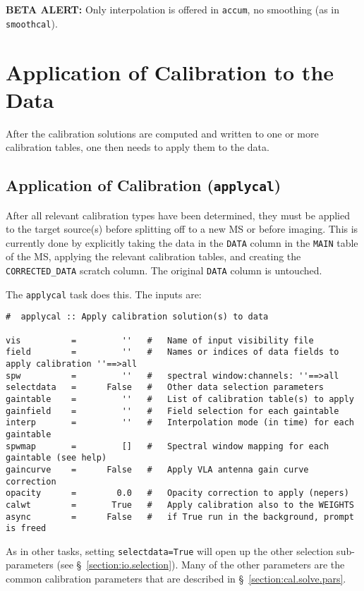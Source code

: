 {\bf BETA ALERT:} Only interpolation is offered in {\tt accum},
no smoothing (as in {\tt smoothcal}).

\section{Application of Calibration to the Data}
\label{section:cal.correct}

After the calibration solutions are computed and written to
one or more calibration tables, one then needs to apply them to the data.

\subsection{Application of Calibration ({\tt applycal})}
\label{section:cal.correct.apply}

After all relevant calibration types have been determined, they must
be applied to the target source(s) before splitting off to a new
MS or before imaging.  This is currently done by explicitly taking the
data in the {\tt DATA} column in the {\tt MAIN} table of the MS, 
applying the relevant calibration tables, and creating the 
{\tt CORRECTED\_DATA} scratch column.  The original {\tt DATA}
column is untouched.

The {\tt applycal} task does this.  The inputs are:
\small
\begin{verbatim}
#  applycal :: Apply calibration solution(s) to data

vis          =         ''   #   Name of input visibility file
field        =         ''   #   Names or indices of data fields to apply calibration ''==>all
spw          =         ''   #   spectral window:channels: ''==>all
selectdata   =      False   #   Other data selection parameters
gaintable    =         ''   #   List of calibration table(s) to apply
gainfield    =         ''   #   Field selection for each gaintable
interp       =         ''   #   Interpolation mode (in time) for each gaintable
spwmap       =         []   #   Spectral window mapping for each gaintable (see help)
gaincurve    =      False   #   Apply VLA antenna gain curve correction
opacity      =        0.0   #   Opacity correction to apply (nepers)
calwt        =       True   #   Apply calibration also to the WEIGHTS
async        =      False   #   if True run in the background, prompt is freed
\end{verbatim}
\normalsize
As in other tasks, setting {\tt selectdata=True} will open up the
other selection sub-parameters (see \S~\ref{section:io.selection}).
Many of the other parameters are the common calibration parameters
that are described in \S~\ref{section:cal.solve.pars}.


